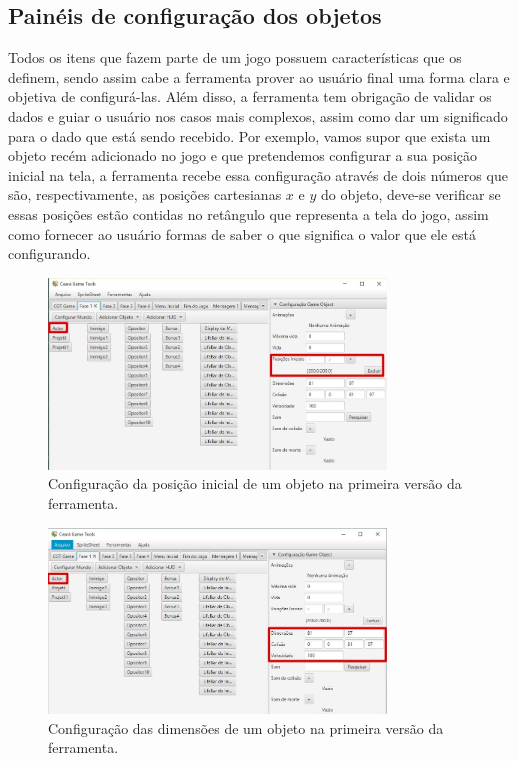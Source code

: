 \documentclass[12pt,twoside,openright,a4paper,english,brazil,sumario=tradicional]{abntex2}
\begin{document}
\subsection{Painéis de configuração dos objetos}
\label{sec:paineis-objetos}
Todos os itens que fazem parte de um jogo possuem características que os definem, sendo assim cabe a ferramenta prover ao usuário final uma forma clara e objetiva de configurá-las. Além disso, a ferramenta tem obrigação de validar os dados e guiar o usuário nos casos mais complexos, assim como dar um significado para o dado que está sendo recebido. Por exemplo, vamos supor que exista um objeto recém adicionado no jogo e que pretendemos configurar a sua posição inicial na tela, a ferramenta recebe essa configuração através de dois números que são, respectivamente, as posições cartesianas $x$ e $y$ do objeto, deve-se verificar se essas posições estão contidas no retângulo que representa a tela do jogo, assim como fornecer ao usuário formas de saber o que significa o valor que ele está configurando.

\begin{figure}[h]
\centering
\includegraphics[width=0.8\textwidth]{images/pos_inicial.jpg}
\caption{Configuração da posição inicial de um objeto na primeira versão da ferramenta.}
\label{fig:obj_pos_inicial}
\end{figure}

\begin{figure}[h]
\centering
\includegraphics[width=0.8\textwidth]{images/obj_dimensoes.jpg}
\caption{Configuração das dimensões de um objeto na primeira versão da ferramenta.}
\label{fig:obj_dimensoes}
\end{figure}
\end{document}
